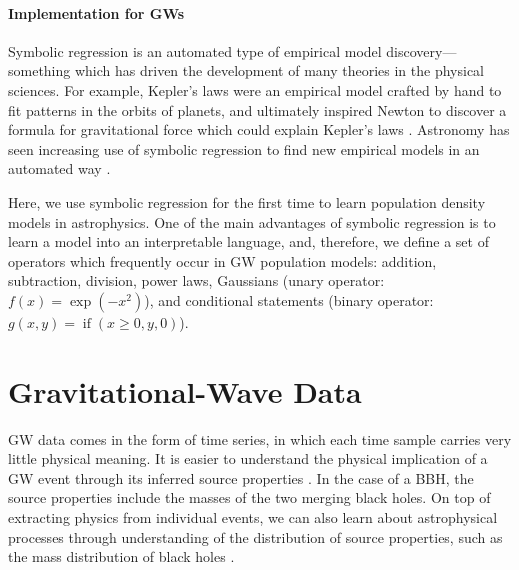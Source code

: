 \documentclass[nohyperref]{article}
\theoremstyle{plain}
\theoremstyle{definition}
\theoremstyle{remark}
\begin{document}
\paragraph{Implementation for GWs}
Symbolic regression is an automated type of empirical model discovery---something which has driven the development of many theories in the physical sciences.
For example, Kepler's laws were an empirical model crafted by hand to fit patterns in the orbits of planets, and ultimately inspired Newton to discover a formula for gravitational force which could explain Kepler's laws \citep[see][for a review of this history]{hawkingShouldersGiantsGreat2004}.
Astronomy has seen increasing use of symbolic regression to find new empirical models in an automated way \citep[e.g.,][]{grahamMachineassistedDiscoveryRelationships2013,cranmerDiscoveringSymbolicModels2020,wadekarModelingAssemblyBias2020,delgadoModelingGalaxyhaloConnection2021,cranmerHistogramPoolingOperators2021,shaoFindingUniversalRelations2021}.

Here, we use symbolic regression for the first time to learn population density models in astrophysics.
One of the main advantages of symbolic regression is to learn a model into an interpretable language, and, therefore, we define a set of operators which frequently occur in GW population models: addition, subtraction, division, power laws, Gaussians (unary operator: $f(x)=\exp(-x^2)$), and conditional statements (binary operator: $g(x, y)=\operatorname{if}(x \geq 0, y, 0)$). 

\section{Gravitational-Wave Data}
\label{sec:GWdata}

GW data comes in the form of time series, in which each time sample carries very little physical meaning.
It is easier to understand the physical implication of a GW event through its inferred source properties \cite{Veitch:2014wba}.
In the case of a BBH, the source properties include the masses of the two merging black holes.
On top of extracting physics from individual events,
we can also learn about astrophysical processes through understanding of the distribution of source properties, such as the mass distribution of black holes \cite{2019PASA...36...10T,Vitale:2020aaz}.
\end{document}
